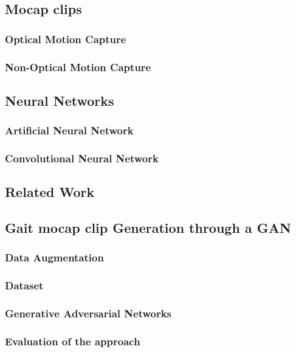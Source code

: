 \documentclass[12pt,oneside,a4paper,english]{article}
\begin{document}
\subsection{Mocap clips}
 
\pagebreak
\subsubsection{Optical Motion Capture}
 
\pagebreak
\subsubsection{Non-Optical Motion Capture}
 
\subsection{Neural Networks}
\subsubsection{Artificial Neural Network}
 
\subsubsection{Convolutional Neural Network}

\subsection{Related Work}
 
\subsection{Gait mocap clip Generation through a GAN}

\subsubsection{Data Augmentation}

\subsubsection{Dataset}

\subsubsection{Generative Adversarial Networks}

\subsubsection{Evaluation of the approach}

\end{document}

